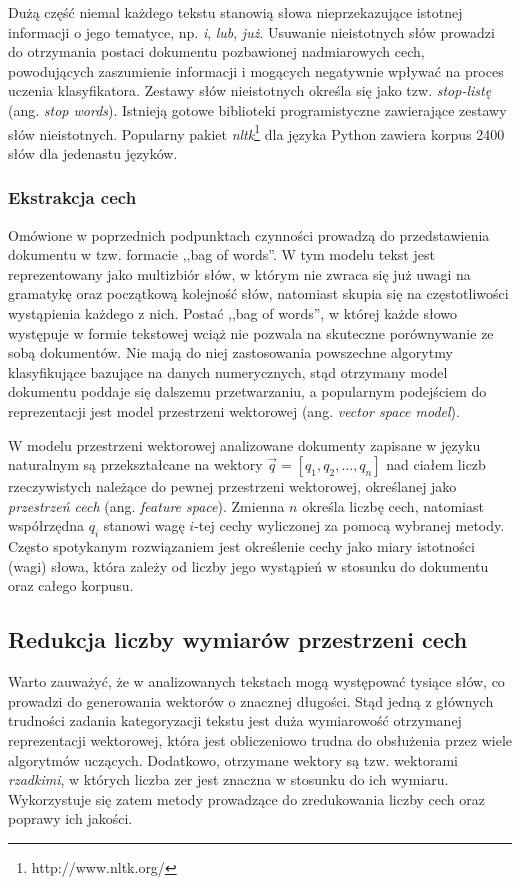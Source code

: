\documentclass{pracamgr}
\begin{document}
Dużą część niemal każdego tekstu stanowią słowa nieprzekazujące istotnej informacji o jego tematyce, np. \textit{i}, \textit{lub}, \textit{już}. Usuwanie nieistotnych słów prowadzi do otrzymania postaci dokumentu pozbawionej nadmiarowych cech, powodujących zaszumienie informacji i mogących negatywnie wpływać na proces uczenia klasyfikatora. Zestawy słów nieistotnych określa się jako tzw. \textit{stop-listę} (ang. \textit{stop words}). Istnieją gotowe biblioteki programistyczne zawierające zestawy słów nieistotnych. Popularny pakiet \textit{nltk}\footnote{http://www.nltk.org/} dla języka Python zawiera korpus 2400 słów dla jedenastu języków.

\subsubsection{Ekstrakcja cech}

Omówione w poprzednich podpunktach czynności prowadzą do przedstawienia dokumentu w tzw. formacie ,,bag of words''. W tym modelu tekst jest reprezentowany jako multizbiór słów, w którym nie zwraca się już uwagi na gramatykę oraz początkową kolejność słów, natomiast skupia się na częstotliwości wystąpienia każdego z nich. Postać ,,bag of words'', w której każde słowo występuje w formie tekstowej wciąż nie pozwala na skuteczne porównywanie ze sobą dokumentów. Nie mają do niej zastosowania powszechne algorytmy klasyfikujące bazujące na danych numerycznych, stąd otrzymany model dokumentu poddaje się dalszemu przetwarzaniu, a popularnym podejściem do reprezentacji jest model przestrzeni wektorowej (ang. \textit{vector space model}).

W modelu przestrzeni wektorowej analizowane dokumenty zapisane w języku naturalnym są przekształcane na wektory $\vec{q} = [q_1, q_2, \ldots, q_n]$ nad ciałem liczb rzeczywistych należące do pewnej przestrzeni wektorowej, określanej jako \textit{przestrzeń cech} (ang. \textit{feature space}). Zmienna $n$ określa liczbę cech, natomiast współrzędna $q_i$ stanowi wagę $i$-tej cechy wyliczonej za pomocą wybranej metody. Często spotykanym rozwiązaniem jest określenie cechy jako miary istotności (wagi) słowa, która zależy od liczby jego wystąpień w stosunku do dokumentu oraz całego korpusu. 

\subsection{Redukcja liczby wymiarów przestrzeni cech}

Warto zauważyć, że w analizowanych tekstach mogą występować tysiące słów, co prowadzi do generowania wektorów o znacznej długości. Stąd jedną z głównych trudności zadania kategoryzacji tekstu jest duża wymiarowość otrzymanej reprezentacji wektorowej, która jest obliczeniowo trudna do obsłużenia przez wiele algorytmów uczących. Dodatkowo, otrzymane wektory są tzw. wektorami \textit{rzadkimi}, w których liczba zer jest znaczna w stosunku do ich wymiaru. Wykorzystuje się zatem metody prowadzące do zredukowania liczby cech oraz poprawy ich jakości.
\end{document}
